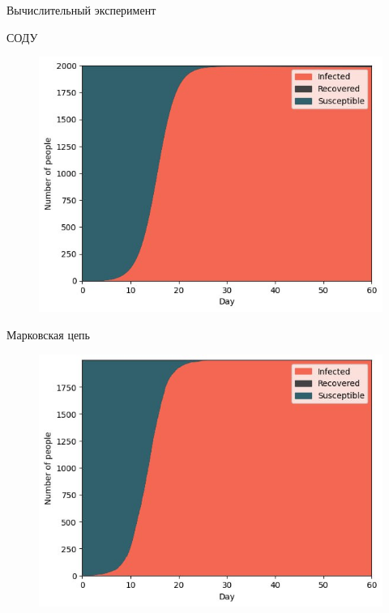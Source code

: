 \documentclass[aspectratio=169]{beamer}
\begin{document}
\begin{frame}{Вычислительный эксперимент}
\begin{center}
    \begin{minipage}[t]{0.47\columnwidth}
        \begin{center}
            СОДУ
        \end{center}
        \vspace{-0.5cm}
		\begin{figure}
			\centering
			\includegraphics[width=\linewidth]{slides/SIR_3.jpeg}
		\end{figure}
	\end{minipage}
	\begin{minipage}[t]{0.47\columnwidth}
        \begin{center}
            Марковская цепь
        \end{center}
        \vspace{-0.5cm}
		\begin{figure}
			\centering
			\includegraphics[width=\linewidth]{slides/stochSIR_3.jpeg}
		\end{figure}
	\end{minipage}
\end{center}
\end{frame}
\end{document}
